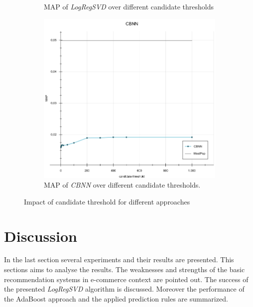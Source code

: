 \documentclass[10pt]{reportMaster}
\begin{document}
\begin{figure}[h!]
\begin{subfigure}[c]{0.5\textwidth}
		\caption[MAP of \textit{LogRegSVD} over different candidate thresholds.]{MAP of \textit{LogRegSVD} over different candidate thresholds}
		\label{fig:LogRegSVDCandidates}
	\end{subfigure}
	\begin{subfigure}[c]{0.5\textwidth}
		\centering
		\includegraphics[width=1\textwidth]{figures/experiments/CBNNCandidates}
		\caption[MAP of \textit{CBNN} over different candidate thresholds]{MAP of \textit{CBNN} over different candidate thresholds.}
		\label{fig:CBNNCandidates}
	\end{subfigure}
	\caption[Impact of candidate threshold for different approaches]{Impact of candidate threshold for different approaches}
	\label{fig:candidates}
\end{figure}


\section{Discussion}
\label{sec:discussion}
In the last section several experiments and their results are presented.
This sections aims to analyse the results.
The weaknesses and strengths of the basic recommendation systems in e-commerce context are pointed out.
The success of the presented \textit{LogRegSVD} algorithm is discussed.
Moreover the performance of the AdaBoost approach and the applied prediction rules are summarized.
\end{document}
